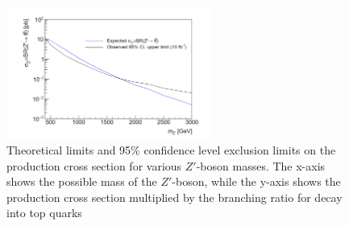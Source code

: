 \begin{figure}[H]
    \centering
    \includegraphics[width=0.6\textwidth]{Figure/CL.png}
    
    \caption{Theoretical limits and 95\% confidence level exclusion limits on the production cross section for various \(Z'\)-boson masses. The x-axis shows the possible mass of the \(Z'\)-boson, while the y-axis shows the production cross section multiplied by the branching ratio for decay into top quarks}

    \label{fig:cl}
\end{figure}













